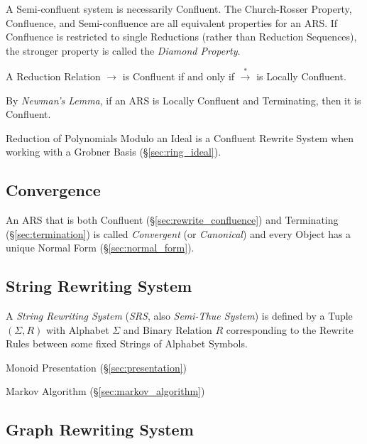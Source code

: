 A Semi-confluent system is necessarily Confluent. The Church-Rosser
Property, Confluence, and Semi-confluence are all equivalent
properties for an ARS. If Confluence is restricted to single
Reductions (rather than Reduction Sequences), the stronger property is
called the \emph{Diamond Property}.

A Reduction Relation $\rightarrow$ is Confluent if and only if
$\stackrel{*}\rightarrow$ is Locally Confluent.

By \emph{Newman's Lemma}, if an ARS is Locally Confluent and
Terminating, then it is Confluent.

Reduction of Polynomials Modulo an Ideal is a Confluent Rewrite System
when working with a Grobner Basis (\S\ref{sec:ring_ideal}).



\subsection{Convergence}\label{sec:rewrite_convergence}

An ARS that is both Confluent (\S\ref{sec:rewrite_confluence}) and
Terminating (\S\ref{sec:termination}) is called \emph{Convergent} (or
\emph{Canonical}) and every Object has a unique Normal Form
(\S\ref{sec:normal_form}).



\subsection{String Rewriting System}\label{sec:string_rewriting}

A \emph{String Rewriting System} (\emph{SRS}, also \emph{Semi-Thue
  System}) is defined by a Tuple $(\Sigma, R)$ with Alphabet $\Sigma$
and Binary Relation $R$ corresponding to the Rewrite Rules between
some fixed Strings of Alphabet Symbols.

Monoid Presentation (\S\ref{sec:presentation})

Markov Algorithm (\S\ref{sec:markov_algorithm})



\subsection{Graph Rewriting System}\label{sec:graph_rewriting}

